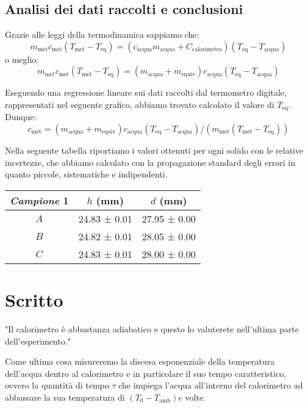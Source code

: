 \documentclass{article}
\begin{document}
\subsection{Analisi dei dati raccolti e conclusioni}
Grazie alle leggi della termodinamica sappiamo che:
    \[
        m_\text{met} c_\text{met} (T_\text{met}-T_\text{eq}) =
        (c_\text{acqua} m_\text{acqua} + C_\text{calorimetro}) (T_\text{eq}-T_\text{acqua})
    \]   
o meglio:
    \[
        m_\text{met} c_\text{met} (T_\text{met}-T_\text{eq}) =
        (m_\text{acqua} + m_\text{equiv}) c_\text{acqua} (T_\text{eq}-T_\text{acqua})
    \]

Eseguendo una regressione lineare sui dati raccolti dal termometro digitale, rappresentati nel    %
seguente grafico, abbiamo trovato calcolato il valore di $T_\text{eq}$. Dunque:
    \[
        c_\text{met} = (m_\text{acqua} + m_\text{equiv}) c_\text{acqua} (T_\text{eq}-T_\text{acqua})/
        (m_\text{met} (T_\text{met}-T_\text{eq}))
    \]

Nella seguente tabella riportiamo i valori ottenuti per ogni solido con le relative incertezze, che abbiamo calcolato con la
propagazione standard degli errori in quanto piccole, sistematiche e indipendenti.

\begin{center}
    \begin{tabular}{ |c|c|c| }
        \hline
        \emph{Campione} 1 & $h$ (mm) & $d$ (mm) \\
        \hline
        $A$ & 24.83 ± 0.01 & 27.95 ± 0.00 \\
        $B$ & 24.82 ± 0.01 & 28.05 ± 0.00 \\
        $C$ & 24.83 ± 0.01 & 28.00 ± 0.00 \\
        \hline
    \end{tabular}
\end{center}









\section{Scritto}
    "Il calorimetro è abbastanza adiabatico e questo lo valuterete nell'ultima parte
    dell'esperimento."


    Come ultima cosa misureremo la discesa esponenziale della temperatura dell'acqua
    dentro al calorimetro e in particolare il suo tempo caratteristico, ovvero la quantità
    di tempo $\tau$ che impiega l'acqua all'interno del calorimetro ad abbassare la sua
    temperatura di $(T_0 - T_\text{amb})e$ volte.
\end{document}
